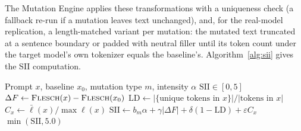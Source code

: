 \documentclass[conference]{IEEEtran}
\begin{document}
The Mutation Engine applies these transformations with a uniqueness
check (a fallback re-run if a mutation leaves text unchanged), and, for
the real-model replication, a length-matched variant per mutation: the
mutated text truncated at a sentence boundary or padded with neutral
filler until its token count under the target model's own tokenizer
equals the baseline's. Algorithm~\ref{alg:sii} gives the SII
computation.
\begin{algorithm}[t]
\caption{Semantic Instability Index}
\label{alg:sii}
\begin{algorithmic}[1]
\REQUIRE Prompt $x$, baseline $x_0$, mutation type $m$, intensity $\alpha$
\ENSURE $\mathrm{SII}\in[0,5]$
\STATE $\Delta F\gets\textsc{Flesch}(x)-\textsc{Flesch}(x_0)$
\STATE $\mathrm{LD}\gets|\{\text{unique tokens in }x\}|/|\text{tokens in }x|$
\STATE $C_x\gets\bar\ell(x)/\max\ell(x)$ 
\STATE $\mathrm{SII}\gets b_m\alpha+\gamma|\Delta F|+\delta(1-\mathrm{LD})+\varepsilon C_x$
\RETURN $\min(\mathrm{SII},5.0)$
\end{algorithmic}
\end{algorithm}
\end{document}
